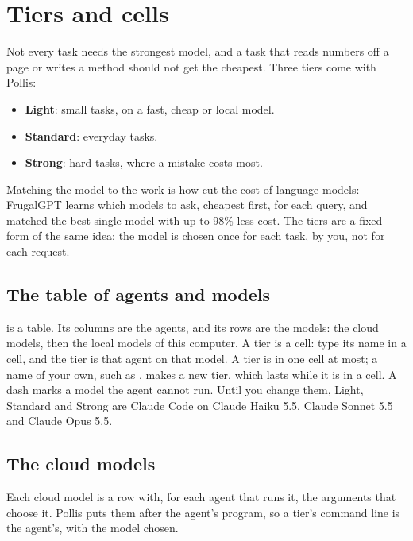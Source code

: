 \section{Tiers and cells}\label{sec:tiers}
Not every task needs the strongest model, and a task that reads numbers off a page or writes a method should not get
the cheapest. Three tiers come with Pollis:
\begin{itemize}
  \item \textbf{Light}: small tasks, on a fast, cheap or local model.
  \item \textbf{Standard}: everyday tasks.
  \item \textbf{Strong}: hard tasks, where a mistake costs most.
\end{itemize}
Matching the model to the work is how  cut the cost of language models:
FrugalGPT learns which models to ask, cheapest first, for each query, and matched the best single model with up to
98\% less cost. The tiers are a fixed form of the same idea: the model is chosen once for each task, by you, not for
each request.

\subsection{The table of agents and models}
 is a table. Its columns are the agents, and its rows
are the models: the cloud models, then the local models of this computer. A tier is a cell: type its name in a cell,
and the tier is that agent on that model. A tier is in one cell at most; a name of your own, such as , makes
a new tier, which lasts while it is in a cell. A dash marks a model the agent cannot run. Until you change them, Light,
Standard and Strong are Claude Code on Claude Haiku 5.5, Claude Sonnet 5.5 and Claude Opus 5.5.

\subsection{The cloud models}
Each cloud model is a row with, for each agent that runs it, the arguments that choose it. Pollis puts them after the
agent's program, so a tier's command line is the agent's, with the model chosen.

